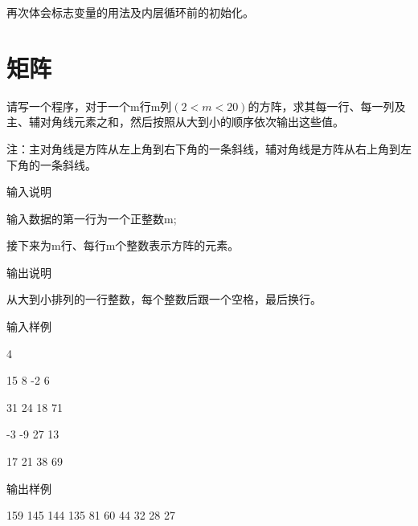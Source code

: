 \begin{note}[要点]
	再次体会标志变量的用法及内层循环前的初始化。
\end{note}

\section{矩阵}
请写一个程序，对于一个m行m列$(2<m<20)$的方阵，求其每一行、每一列及主、辅对角线元素之和，然后按照从大到小的顺序依次输出这些值。

注：主对角线是方阵从左上角到右下角的一条斜线，辅对角线是方阵从右上角到左下角的一条斜线。

输入说明
	
输入数据的第一行为一个正整数m;

接下来为m行、每行m个整数表示方阵的元素。

输出说明	

从大到小排列的一行整数，每个整数后跟一个空格，最后换行。

输入样例
	
4

15  8   -2   6

31  24  18  71

-3  -9   27  13

17  21  38  69

输出样例
	
159 145 144 135 81 60 44 32 28 27

